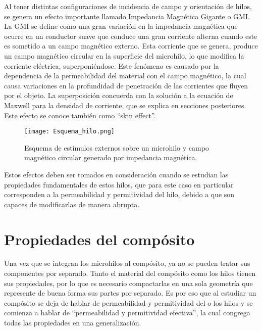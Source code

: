 \documentclass[12pt,letterpaper]{report}
\numberwithin{equation}{section}
\begin{document}
Al tener distintas configuraciones de incidencia de campo y orientación de hilos, se genera un efecto importante llamado Impedancia Magnética Gigante o GMI. La GMI se define como una gran variación en la impedancia magnética que ocurre en un conductor suave que conduce una gran corriente alterna cuando este es sometido a un campo magnético externo. Esta corriente que se genera, produce un campo magnético circular en la superficie del microhilo, lo que modifica la corriente eléctrica, superponiéndose.
Este fenómeno es causado por la dependencia de la permeabilidad del material con el campo magnético, la cual causa variaciones en la profundidad de penetración de las corrientes que fluyen por el objeto. La superposición concuerda con la solución a la ecuación de Maxwell para la densidad de corriente, que se explica en secciones posteriores. Este efecto se conoce también como ``skin effect''.

\begin{figure}[H]
	\centering\texttt{[image: Esquema\_hilo.png]}\\
	\caption{Esquema de estímulos externos sobre un microhilo y campo magnético circular generado por impedancia magnética. \cite{Wire_theory_1}}
	\label{fig:Esquema_hilo}
\end{figure} 


Estos efectos deben ser tomados en consideración cuando se estudian las propiedades fundamentales de estos hilos, que para este caso en particular corresponden a la permeabilidad y permitividad del hilo, debido a que son capaces de modificarlas de manera abrupta.

\section{Propiedades del compósito}

Una vez que se integran los microhilos al compósito, ya no se pueden tratar sus componentes por separado. Tanto el material del compósito como los hilos tienen sus propiedades, por lo que es necesario compactarlas en una sola geometría que represente de buena forma sus partes por separado. Es por eso que al estudiar un compósito se deja de hablar de permeabilidad y permitividad del o los hilos y se comienza a hablar de ``permeabilidad y permitividad efectiva'', la cual congrega todas las propiedades en una generalización.
\end{document}
